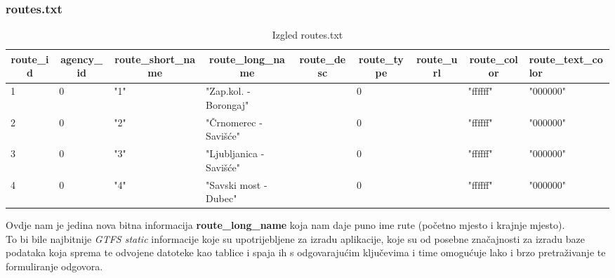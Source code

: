 \documentclass[zavrsnirad]{fer}
\begin{document}
\subsubsection{routes.txt}

\begin{table}[htb]
	\begin{adjustbox}{width=\columnwidth,center}
	\begin{tabular}{l|l|l|l|l|l|l|l|l}
		\hline
		\multicolumn{1}{c|}{\textbf{route\_id}} & \multicolumn{1}{c|}{\textbf{agency\_id}} & \multicolumn{1}{c|}{\textbf{route\_short\_name}} & \multicolumn{1}{c|}{\textbf{route\_long\_name}} & \multicolumn{1}{c|}{\textbf{route\_desc}} & \multicolumn{1}{c|}{\textbf{route\_type}} & \multicolumn{1}{c|}{\textbf{route\_url}} & \multicolumn{1}{c|}{\textbf{route\_color}} & \textbf{route\_text\_color} \\ \hline
		1 & 0 & "1" & "Zap.kol. - Borongaj" &  & 0 &  & "ffffff" & "000000" \\ \hline
		2 & 0 & "2" & "Črnomerec - Savišće" &  & 0 &  & "ffffff" & "000000" \\ \hline
		3 & 0 & "3" & "Ljubljanica -Savišće" &  & 0 &  & "ffffff" & "000000" \\ \hline
		4 & 0 & "4" & "Savski most - Dubec" &  & 0 &  & "ffffff" & "000000" \\ \hline
	\end{tabular}
	\end{adjustbox}
	\caption{Izgled routes.txt}
	\label{tbl:routes}
\end{table}

Ovdje nam je jedina nova bitna informacija \textbf{route\_long\_name} koja nam daje puno ime rute (početno mjesto i krajnje mjesto).\\

To bi bile najbitnije \textit{GTFS static} informacije koje su upotrijebljene za izradu aplikacije, koje su od posebne značajnosti za izradu baze podataka koja sprema te odvojene datoteke kao tablice i spaja ih s odgovarajućim ključevima i time omogućuje lako i brzo pretraživanje te formuliranje odgovora.

\newpage
\end{document}

